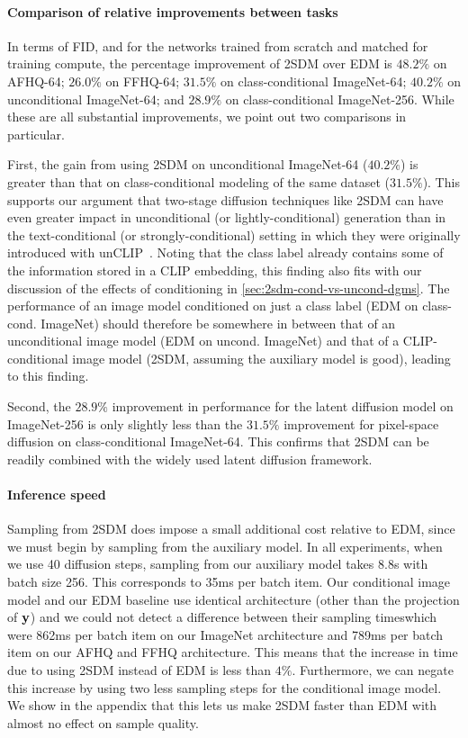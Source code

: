 \paragraph{Comparison of relative improvements between tasks}
In terms of FID, and for the networks trained from scratch and matched for training compute, the percentage improvement of 2SDM over EDM is $48.2\%$ on AFHQ-64; $26.0\%$ on FFHQ-64; $31.5\%$ on class-conditional ImageNet-64; $40.2\%$ on unconditional ImageNet-64; and $28.9\%$ on class-conditional ImageNet-256. While these are all substantial improvements, we point out two comparisons in particular. 

First, the gain from using 2SDM on unconditional ImageNet-64 ($40.2\%$) is greater than that on class-conditional modeling of the same dataset ($31.5\%$). This supports our argument that two-stage diffusion techniques like 2SDM can have even greater impact in unconditional (or lightly-conditional) generation than in the text-conditional (or strongly-conditional) setting in which they were originally introduced with unCLIP~\citep{ramesh2022hierarchical}.  Noting that the class label already contains some of the information stored in a CLIP embedding, this finding also fits with our discussion of the effects of conditioning in \cref{sec:2sdm-cond-vs-uncond-dgms}. The performance of an image model conditioned on just a class label (EDM on class-cond. ImageNet) should therefore be somewhere in between that of an unconditional image model (EDM on uncond. ImageNet) and that of a CLIP-conditional image model (2SDM, assuming the auxiliary model is good), leading to this finding.

Second, the $28.9\%$ improvement in performance for the latent diffusion model on ImageNet-256 is only slightly less than the $31.5\%$ improvement for pixel-space diffusion on class-conditional ImageNet-64. This confirms that 2SDM can be readily combined with the widely used latent diffusion framework.

\paragraph{Inference speed}
Sampling from 2SDM does impose a small additional cost relative to EDM, since we must begin by sampling from the auxiliary model. In all experiments, when we use 40 diffusion steps, sampling from our auxiliary model takes 8.8s with batch size 256. This corresponds to 35ms per batch item. Our conditional image model and our EDM baseline use identical architecture (other than the projection of ${\mathbf{y}}$) and we could not detect a difference between their sampling timeswhich were 862ms per batch item on our ImageNet architecture and 789ms per batch item on our AFHQ and FFHQ architecture. This means that the increase in time due to using 2SDM instead of EDM is less than $4\%$. Furthermore, we can negate this increase by using two less sampling steps for the conditional image model. We show in the appendix that this lets us make 2SDM faster than EDM with almost no effect on sample quality.


